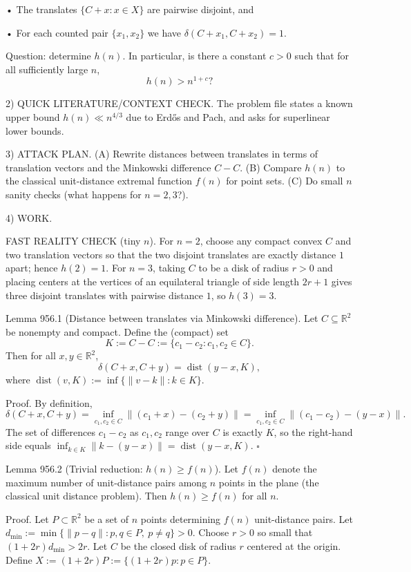 • The translates $\{C+x: x\in X\}$ are pairwise disjoint, and

• For each counted pair $\{x_1,x_2\}$ we have $\delta(C+x_1, C+x_2)=1$.

Question: determine $h(n)$. In particular, is there a constant $c>0$ such that for all sufficiently large $n$,
\[
 h(n) > n^{1+c}?
\]

2) QUICK LITERATURE/CONTEXT CHECK.
The problem file states a known upper bound $h(n)\ll n^{4/3}$ due to Erd\H{o}s and Pach, and asks for superlinear lower bounds.

3) ATTACK PLAN.
(A) Rewrite distances between translates in terms of translation vectors and the Minkowski difference $C-C$.
(B) Compare $h(n)$ to the classical unit-distance extremal function $f(n)$ for point sets.
(C) Do small $n$ sanity checks (what happens for $n=2,3$?).

4) WORK.

FAST REALITY CHECK (tiny $n$).
For $n=2$, choose any compact convex $C$ and two translation vectors so that the two disjoint translates are exactly distance $1$ apart; hence $h(2)=1$.
For $n=3$, taking $C$ to be a disk of radius $r>0$ and placing centers at the vertices of an equilateral triangle of side length $2r+1$ gives three disjoint translates with pairwise distance $1$, so $h(3)=3$.

Lemma 956.1 (Distance between translates via Minkowski difference).
Let $C\subseteq\mathbb{R}^2$ be nonempty and compact. Define the (compact) set
\[
K:=C-C:=\{c_1-c_2: c_1,c_2\in C\}.
\]
Then for all $x,y\in\mathbb{R}^2$,
\[
\delta(C+x, C+y) = \operatorname{dist}(y-x, K),
\]
where $\operatorname{dist}(v,K):=\inf\{\|v-k\|:k\in K\}$.

Proof.
By definition,
\[
\delta(C+x,C+y)=\inf_{c_1,c_2\in C}\| (c_1+x)-(c_2+y)\|
 =\inf_{c_1,c_2\in C}\|(c_1-c_2)-(y-x)\|.
\]
The set of differences $c_1-c_2$ as $c_1,c_2$ range over $C$ is exactly $K$, so the right-hand side equals
$\inf_{k\in K}\|k-(y-x)\|=\operatorname{dist}(y-x,K)$.
\hfill $\square$

Lemma 956.2 (Trivial reduction: $h(n)\ge f(n)$).
Let $f(n)$ denote the maximum number of unit-distance pairs among $n$ points in the plane (the classical unit distance problem).
Then $h(n)\ge f(n)$ for all $n$.

Proof.
Let $P\subset\mathbb{R}^2$ be a set of $n$ points determining $f(n)$ unit-distance pairs.
Let $d_{\min}:=\min\{\|p-q\|:p,q\in P,\ p\ne q\}>0$.
Choose $r>0$ so small that $(1+2r)d_{\min}>2r$.
Let $C$ be the closed disk of radius $r$ centered at the origin.
Define $X:=(1+2r)P:=\{(1+2r)p:p\in P\}$.

